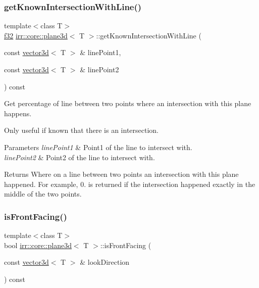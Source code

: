 \subsubsection{\texorpdfstring{get\+Known\+Intersection\+With\+Line()}{getKnownIntersectionWithLine()}\hspace{0.1cm}{\footnotesize\ttfamily [2/2]}}
{\footnotesize\ttfamily template$<$class T$>$ \\
\hyperlink{namespaceirr_a0277be98d67dc26ff93b1a6a1d086b07}{f32} \hyperlink{classirr_1_1core_1_1plane3d}{irr\+::core\+::plane3d}$<$ T $>$\+::get\+Known\+Intersection\+With\+Line (\begin{DoxyParamCaption}\item[{const \hyperlink{classirr_1_1core_1_1vector3d}{vector3d}$<$ T $>$ \&}]{line\+Point1,  }\item[{const \hyperlink{classirr_1_1core_1_1vector3d}{vector3d}$<$ T $>$ \&}]{line\+Point2 }\end{DoxyParamCaption}) const\hspace{0.3cm}{\ttfamily [inline]}}



Get percentage of line between two points where an intersection with this plane happens. 

Only useful if known that there is an intersection. 
\begin{DoxyParams}{Parameters}
{\em line\+Point1} & Point1 of the line to intersect with. \\
\hline
{\em line\+Point2} & Point2 of the line to intersect with. \\
\hline
\end{DoxyParams}
\begin{DoxyReturn}{Returns}
Where on a line between two points an intersection with this plane happened. For example, 0. is returned if the intersection happened exactly in the middle of the two points. 
\end{DoxyReturn}
\mbox{\label{classirr_1_1core_1_1plane3d_aca0237b25cbf4fe13d87b14a04d68df9}} 
\subsubsection{\texorpdfstring{is\+Front\+Facing()}{isFrontFacing()}\hspace{0.1cm}{\footnotesize\ttfamily [1/2]}}
{\footnotesize\ttfamily template$<$class T$>$ \\
bool \hyperlink{classirr_1_1core_1_1plane3d}{irr\+::core\+::plane3d}$<$ T $>$\+::is\+Front\+Facing (\begin{DoxyParamCaption}\item[{const \hyperlink{classirr_1_1core_1_1vector3d}{vector3d}$<$ T $>$ \&}]{look\+Direction }\end{DoxyParamCaption}) const\hspace{0.3cm}{\ttfamily [inline]}}



